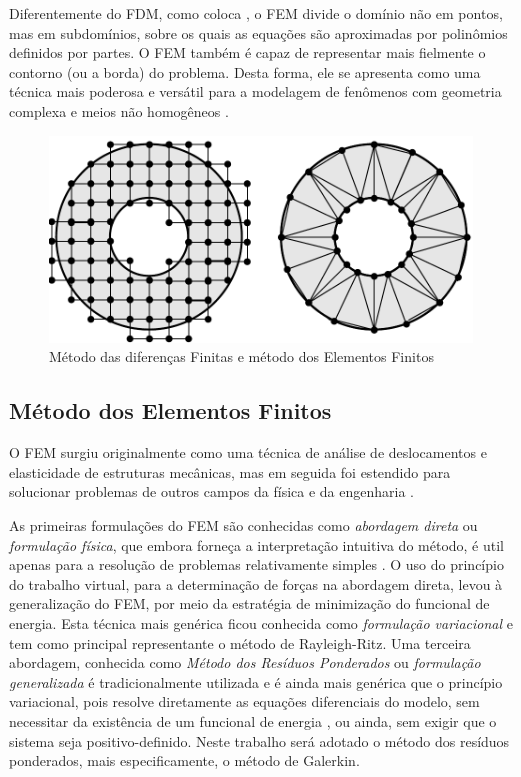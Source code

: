 \documentclass[
    12pt,               %
    openright,          %
    oneside,
    a4paper,            %
    english,            %
    french,             %
    spanish,            %
    brazil              %
    ]{abntex2}
\begin{document}
Diferentemente do FDM, como coloca , o FEM divide o domínio não em pontos, mas em subdomínios, sobre os quais as equações são aproximadas por polinômios definidos por partes. O FEM também é capaz de representar mais fielmente o contorno (ou a borda) do problema. Desta forma, ele se apresenta como uma técnica mais poderosa e versátil para a modelagem de fenômenos com geometria complexa e meios não homogêneos \cite{sadiku}. 

\begin{figure}[!htb]
	\centering
	\includegraphics[scale=0.5]{figuras/fdm_fem.pdf}
	\caption{Método das diferenças Finitas e método dos Elementos Finitos}
	\label{fig:mdfFem}
\end{figure}

\subsection{Método dos Elementos Finitos}

O FEM surgiu originalmente como uma técnica de análise de deslocamentos e elasticidade de estruturas mecânicas, mas em seguida foi estendido para solucionar problemas de outros campos da física e da engenharia \cite{jin, desai, zien}.

As primeiras formulações do FEM são conhecidas como \textit{abordagem direta} ou \textit{formulação física}, que embora forneça a interpretação intuitiva do método, é util apenas para a resolução de problemas relativamente simples \cite{huebner, desai, zien}. O uso do princípio do trabalho virtual, para a determinação de forças na abordagem direta, levou à generalização do FEM, por meio da estratégia de minimização do funcional de energia. Esta técnica mais genérica  ficou conhecida como \textit{formulação variacional} \cite{desai, zien, jin} e tem como principal representante o método de Rayleigh-Ritz. Uma terceira abordagem, conhecida como \textit{Método dos Resíduos Ponderados} ou \textit{formulação generalizada} \cite{zien, huebner} é tradicionalmente utilizada e é ainda mais genérica que o princípio variacional, pois resolve diretamente as equações diferenciais do modelo, sem necessitar da existência de um funcional de energia \cite{desai}, ou ainda, sem exigir que o sistema seja positivo-definido. Neste trabalho será adotado o método dos resíduos ponderados, mais especificamente, o método de Galerkin.
\end{document}
